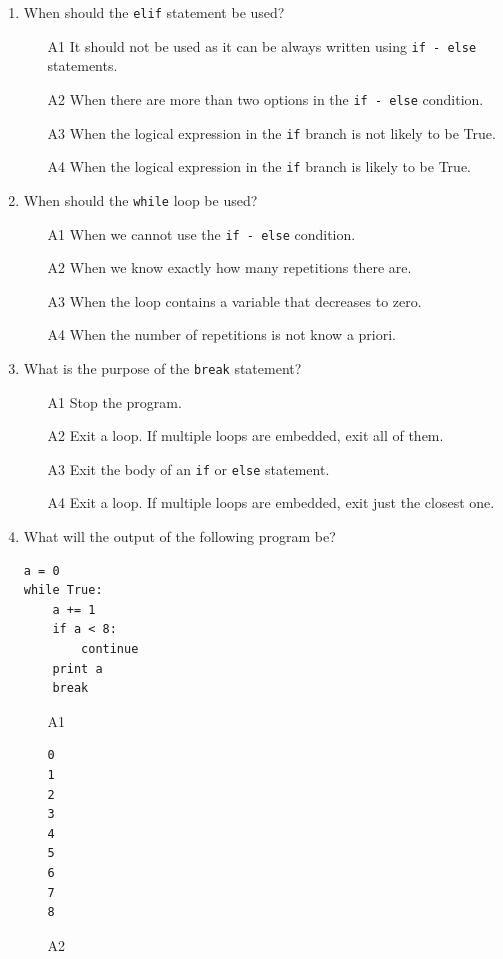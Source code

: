 \begin{enumerate}
\item When should the {\tt elif} statement be used?
\begin{enumerate}
\item[A1] It should not be used as it can be always written using {\tt if - else} statements. 
\item[A2] When there are more than two options in the {\tt if - else} condition. 
\item[A3] When the logical expression in the {\tt if} branch is not likely to be True.
\item[A4] When the logical expression in the {\tt if} branch is likely to be True.
\end{enumerate}
\item When should the {\tt while} loop be used?
\begin{enumerate}
\item[A1] When we cannot use the {\tt if - else} condition.
\item[A2] When we know exactly how many repetitions there are.
\item[A3] When the loop contains a variable that decreases to zero.
\item[A4] When the number of repetitions is not know a priori.
\end{enumerate}
\item What is the purpose of the {\tt break} statement?
\begin{enumerate}
\item[A1] Stop the program.
\item[A2] Exit a loop. If multiple loops are embedded, exit all of them.
\item[A3] Exit the body of an {\tt if} or {\tt else} statement.
\item[A4] Exit a loop. If multiple loops are embedded, exit just the closest one.
\end{enumerate}
\item What will the output of the following program be?
\begin{verbatim}
a = 0
while True:
    a += 1
    if a < 8:
        continue
    print a
    break
\end{verbatim}
\begin{enumerate}
\item[A1] 
\begin{verbatim}
0
1
2
3
4
5
6
7
8
\end{verbatim}
\item[A2] 
\begin{verbatim}

\end{verbatim}
\end{enumerate}
\end{enumerate}
